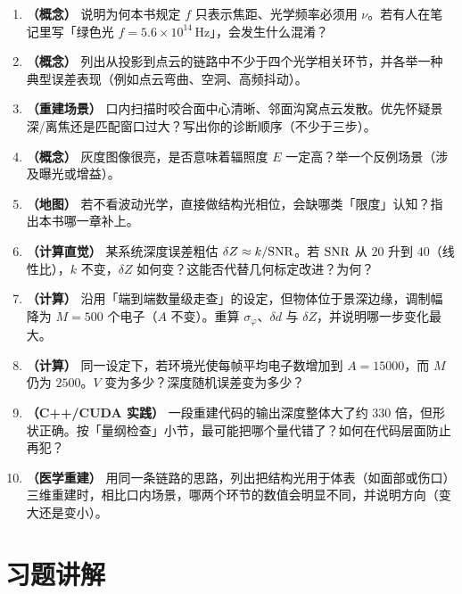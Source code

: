 \begin{enumerate}
  \item \textbf{（概念）} 说明为何本书规定 $f$ 只表示焦距、光学频率必须用 $\nu$。若有人在笔记里写「绿色光 $f=5.6\times10^{14}\,\mathrm{Hz}$」，会发生什么混淆？
  \item \textbf{（概念）} 列出从投影到点云的链路中不少于四个光学相关环节，并各举一种典型误差表现（例如点云弯曲、空洞、高频抖动）。
  \item \textbf{（重建场景）} 口内扫描时咬合面中心清晰、邻面沟窝点云发散。优先怀疑景深/离焦还是匹配窗口过大？写出你的诊断顺序（不少于三步）。
  \item \textbf{（概念）} 灰度图像很亮，是否意味着辐照度 $E$ 一定高？举一个反例场景（涉及曝光或增益）。
  \item \textbf{（地图）} 若不看波动光学，直接做结构光相位，会缺哪类「限度」认知？指出本书哪一章补上。
  \item \textbf{（计算直觉）} 某系统深度误差粗估 $\delta Z \approx k/\mathrm{SNR}$。若 $\mathrm{SNR}$ 从 $20$ 升到 $40$（线性比），$k$ 不变，$\delta Z$ 如何变？这能否代替几何标定改进？为何？
  \item \textbf{（计算）} 沿用「端到端数量级走查」的设定，但物体位于景深边缘，调制幅降为 $M=500$ 个电子（$A$ 不变）。重算 $\sigma_\varphi$、$\delta d$ 与 $\delta Z$，并说明哪一步变化最大。
  \item \textbf{（计算）} 同一设定下，若环境光使每帧平均电子数增加到 $A=15000$，而 $M$ 仍为 $2500$。$V$ 变为多少？深度随机误差变为多少？
  \item \textbf{（C++/CUDA 实践）} 一段重建代码的输出深度整体大了约 $330$ 倍，但形状正确。按「量纲检查」小节，最可能把哪个量代错了？如何在代码层面防止再犯？
  \item \textbf{（医学重建）} 用同一条链路的思路，列出把结构光用于体表（如面部或伤口）三维重建时，相比口内场景，哪两个环节的数值会明显不同，并说明方向（变大还是变小）。
\end{enumerate}

\section{习题讲解}
\label{sec:ch00-solutions}

